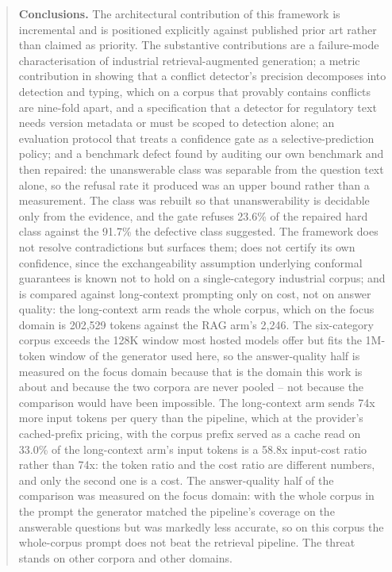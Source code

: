 \documentclass[preprint,3p,times]{elsarticle}
\begin{document}
\begin{abstract}
\textbf{Conclusions.} The architectural contribution of this framework is
incremental and is positioned explicitly against published prior art rather
than claimed as priority. The substantive contributions are a failure-mode
characterisation of industrial retrieval-augmented generation; a metric
contribution in showing that a conflict detector's precision decomposes into
detection and typing, which on a corpus that provably contains conflicts are
nine-fold apart, and a specification that a detector for regulatory text needs
version metadata or must be scoped to detection alone; an evaluation
protocol that treats a confidence gate as a selective-prediction policy; and
a benchmark defect found by auditing our own benchmark and then repaired: the
unanswerable class was separable from the question text alone, so the refusal
rate it produced was an upper bound rather than a measurement. The class was
rebuilt so that unanswerability is decidable only from the evidence, and the
gate refuses 23.6\% of the repaired hard class against the
91.7\% the defective class suggested. The
framework does not resolve contradictions but surfaces them; does not certify
its own confidence, since the exchangeability assumption underlying conformal
guarantees is known not to hold on a single-category industrial corpus; and is
compared against long-context prompting only on cost, not on answer quality:
the long-context arm reads the whole corpus, which on the focus domain is
202,529 tokens against the RAG arm's 2,246. The
six-category corpus exceeds the 128K window most hosted models offer but fits
the 1M-token window of the generator used here, so the answer-quality half is
measured on the focus domain because that is the domain this work is about and
because the two corpora are never pooled -- not because the comparison would
have been impossible.
The long-context arm sends 74x more input tokens per query than the pipeline, which at the provider's cached-prefix pricing, with the corpus prefix served as a cache read on 33.0\% of the long-context arm's input tokens is a 58.8x input-cost ratio rather than 74x: the token ratio and the cost ratio are different numbers, and only the second one is a cost. The answer-quality half of the
comparison was measured on the focus domain: with the whole corpus in the
prompt the generator matched the pipeline's coverage on the answerable
questions but was markedly less accurate, so on this corpus the whole-corpus
prompt does not beat the retrieval pipeline. The threat stands on other
corpora and other domains.
\end{abstract}
\end{document}
